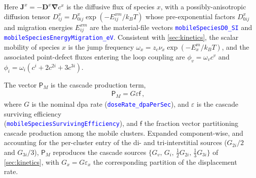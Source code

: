 \documentclass{article}
\newcommand{\textttclr}[1]{\textcolor{blue}{\texttt{#1}}}
\newcommand{\spvec}[1]{\bm{\mathsf{#1}}}   %
\begin{document}
Here $\bm J^x =-\bm D^x\bm\nabla c^x$ is the diffusive flux of species $x$, with a possibly-anisotropic diffusion tensor $D^x_{ij}=D^x_{0ij}\exp(-E^{xm}_{ij}/k_BT)$ whose pre-exponential factors $D^x_{0ij}$ and migration energies $E^{xm}_{ij}$ are the material-file vectors \textttclr{mobileSpeciesD0\_SI} and \textttclr{mobileSpeciesEnergyMigration\_eV}. Consistent with \cref{sec:kinetics}, the scalar mobility of species $x$ is the jump frequency $\omega_x=z_c\nu_x\exp(-E_x^m/k_BT)$, and the associated point-defect fluxes entering the loop coupling are $\phi_v=\omega_v c^v$ and $\phi_i=\omega_i(c^i+2c^{2i}+3c^{3i})$.

The vector $\spvec{P}_M$ is the cascade production term,
\begin{align}\label{Eq:PGM}
   \spvec{P}_{M} =    G \varepsilon \spvec{f}\,,
\end{align}
where $G$ is the nominal dpa rate (\textttclr{doseRate\_dpaPerSec}), and $\varepsilon$ is the cascade surviving efficiency\\ (\textttclr{mobileSpeciesSurvivingEfficiency}), and $\spvec{f}$ the fraction vector partitioning cascade production among the mobile clusters. Expanded component-wise, and accounting for the per-cluster entry of the di- and tri-interstitial sources ($G_{2i}/2$ and $G_{3i}/3$), $\spvec{P}_M$ reproduces the cascade sources $\{G_v,\,G_i,\,\tfrac12 G_{2i},\,\tfrac13 G_{3i}\}$ of \cref{sec:kinetics}, with $G_x=G\varepsilon_x$ the corresponding partition of the displacement rate.
\end{document}
